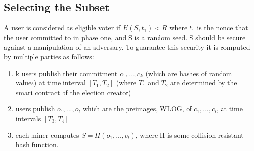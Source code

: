 \documentclass[]{paper}
\begin{document}
					
					\subsection{Selecting the Subset}
					A user is considered as eligible voter if $H(S,t_1)<R$ where $t_1$ is the nonce that the user committed to in phase one, and S is a random seed. S should be secure against a manipulation of an adversary.  To guarantee this security it is computed by multiple parties as follows:
					\begin{enumerate}
						\item k users publish their commitment $c_1,...,c_k$ (which are hashes of random values) at  time interval $[T_1,T_2]$ (where $T_1$ and $T_2$ are determined by the smart contract of the election creator)
						\item users publish $o_1,...,o_l$  which are the preimages, WLOG, of $c_1,...,c_l$, at time intervals $[T_3,T_4]$ 
						\item each miner computes $S= H(o_1,...,o_l)$, where H is some collision resistant hash function.
					\end{enumerate}
					
\end{document}
